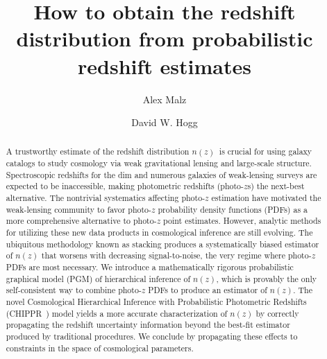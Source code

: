 \documentclass[iop]{emulateapj}
\newcommand{\project}[1]{{\textsc{#1}}~}
\newcommand{\Chippr}{\project{CHIPPR}}
\newcommand{\nz}{$n(z)$}
\begin{document}
\title{How to obtain the redshift distribution from probabilistic redshift 
estimates}

\author{Alex Malz}
\author{David W. Hogg}


\begin{abstract}
A trustworthy estimate of the redshift distribution \nz\ is crucial for using 
galaxy catalogs to study cosmology via weak gravitational lensing and 
large-scale structure.
Spectroscopic redshifts for the dim and numerous galaxies of weak-lensing 
surveys are expected to be inaccessible, making photometric redshifts 
(photo-$z$s) the next-best alternative.
The nontrivial systematics affecting photo-$z$ estimation have motivated the 
weak-lensing community to favor photo-$z$ probability density functions (PDFs) 
as a more comprehensive alternative to photo-$z$ point estimates.
However, analytic methods for utilizing these new data products in cosmological 
inference are still evolving.
The ubiquitous methodology known as stacking produces a systematically biased 
estimator of $n(z)$ that worsens with decreasing signal-to-noise, the very 
regime where photo-$z$ PDFs are most necessary.
We introduce a mathematically rigorous probabilistic graphical model (PGM) of 
hierarchical inference of $n(z)$, which is provably the only self-consistent 
way to combine photo-$z$ PDFs to produce an estimator of $n(z)$.
The novel Cosmological Hierarchical Inference with Probabilistic Photometric 
Redshifts (\Chippr) model yields a more accurate characterization of $n(z)$ by 
correctly propagating the redshift uncertainty information beyond the best-fit 
estimator produced by traditional procedures.
We conclude by propagating these effects to constraints in the space of 
cosmological parameters.
\end{abstract}

\end{document}

